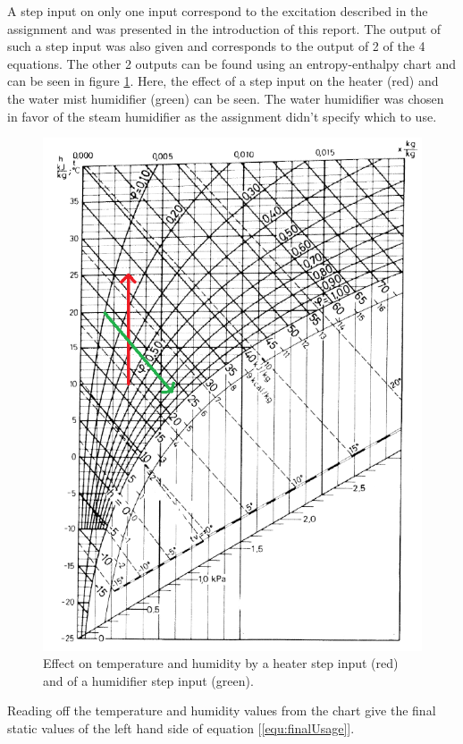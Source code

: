 \documentclass[a4paper, titlepage]{article}
\begin{document}
A step input on only one input correspond to the excitation described in the assignment and was presented in the introduction of this report.
The output of such a step input was also given and corresponds to the output of 2 of the 4 equations.
The other 2 outputs can be found using an entropy-enthalpy chart and can be seen in figure \ref{fig:entropy}.
Here, the effect of a step input on the heater (red) and the water mist humidifier (green) can be seen.
The water humidifier was chosen in favor of the steam humidifier as the assignment didn't specify which to use.

\begin{figure}
\center
\includegraphics[scale=0.7]{../figures/enthalpyEntropy.png}
\caption{Effect on temperature and humidity by a heater step input (red) and of a humidifier step input (green).}
\label{fig:entropy}
\end{figure}

Reading off the temperature and humidity values from the chart give the final static values of the left hand side of equation [\ref{equ:finalUsage}].
\end{document}
